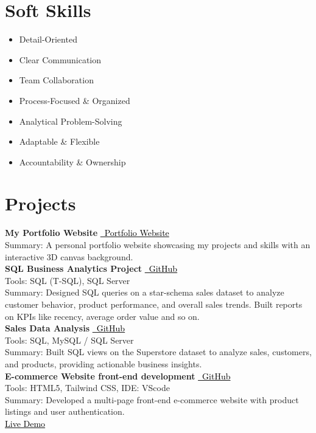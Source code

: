\documentclass[a4paper,10pt]{article}
\newcommand{\githubbutton}[2]{%
  \colorbox{gray!20}{\href{#1}{\textcolor{black}{\faGithub\ #2}}}%
}
\newcommand{\portfoliobutton}[2]{%
  \colorbox{gray!20}{\href{#1}{\textcolor{black}{\faGlobe\ #2}}}%
}
\newcommand{\cvsection}[2]{%
  \section*{\textcolor{blue!50!black}{#1}}\label{#2}%
  \vspace{4pt}%
}
\begin{document}
\cvsection{Soft Skills}{sec:softskills}
\begin{itemize}[label={\faCheckCircle}]
  \item Detail-Oriented  
  \item Clear Communication  
  \item Team Collaboration  
  \item Process-Focused \& Organized  
  \item Analytical Problem-Solving  
  \item Adaptable \& Flexible  
  \item Accountability \& Ownership  
\end{itemize}

\cvsection{Projects}{sec:projects}
\textbf{My Portfolio Website} 
\portfoliobutton{https://nuzmols-3d-canvas.lovable.app}{Portfolio Website} \\
Summary: A personal portfolio website showcasing my projects and skills with an interactive 3D canvas background. \\

\vspace{4pt}
\textbf{SQL Business Analytics Project} 
\githubbutton{https://github.com/Nuzmolkhan/sql-sales-customer-product-insights}{GitHub} \\
Tools: SQL (T-SQL), SQL Server \\
Summary: Designed SQL queries on a star-schema sales dataset to analyze customer behavior, product performance, and overall sales trends. Built reports on KPIs like recency, average order value and so on. \\

\vspace{4pt}
\textbf{Sales Data Analysis} 
\githubbutton{https://github.com/Nuzmolkhan/sales_data_analysis}{GitHub} \\
Tools: SQL, MySQL / SQL Server \\
Summary: Built SQL views on the Superstore dataset to analyze sales, customers, and products, providing actionable business insights. \\

\vspace{4pt}
\textbf{E-commerce Website front-end development} 
\githubbutton{https://github.com/Nuzmolkhan/Online-Shopping-website-front-end-designing-using-html-tailwindcss}{GitHub} \\
Tools: HTML5, Tailwind CSS, IDE: VScode \\
Summary: Developed a multi-page front-end e-commerce website with product listings and user authentication. \\[2pt]
\colorbox{gray!20}{\href{https://nuzmolkhan.github.io/Online-Shopping-website-front-end-designing-using-html-tailwindcss/index.html}{\textcolor{black}{Live Demo}}}
\end{document}
